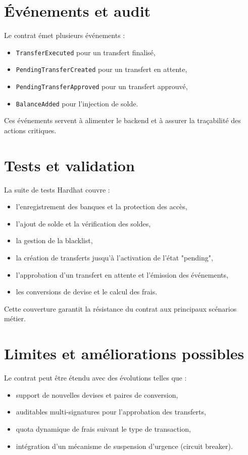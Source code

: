 \documentclass[a4paper,12pt]{report}
\begin{document}
\section{Événements et audit}
Le contrat émet plusieurs événements :
\begin{itemize}[leftmargin=*,nosep]
  \item \texttt{TransferExecuted} pour un transfert finalisé,
  \item \texttt{PendingTransferCreated} pour un transfert en attente,
  \item \texttt{PendingTransferApproved} pour un transfert approuvé,
  \item \texttt{BalanceAdded} pour l'injection de solde.
\end{itemize}
Ces événements servent à alimenter le backend et à assurer la traçabilité des actions critiques.

\section{Tests et validation}
La suite de tests Hardhat couvre :
\begin{itemize}[leftmargin=*,nosep]
  \item l'enregistrement des banques et la protection des accès,
  \item l'ajout de solde et la vérification des soldes,
  \item la gestion de la blacklist,
  \item la création de transferts jusqu'à l'activation de l'état "pending",
  \item l'approbation d'un transfert en attente et l'émission des événements,
  \item les conversions de devise et le calcul des frais.
\end{itemize}
Cette couverture garantit la résistance du contrat aux principaux scénarios métier.

\section{Limites et améliorations possibles}
Le contrat peut être étendu avec des évolutions telles que :
\begin{itemize}[leftmargin=*,nosep]
  \item support de nouvelles devises et paires de conversion,
  \item auditables multi-signatures pour l'approbation des transferts,
  \item quota dynamique de frais suivant le type de transaction,
  \  
  \item intégration d'un mécanisme de suspension d'urgence (circuit breaker).
\end{itemize}
\end{document}
